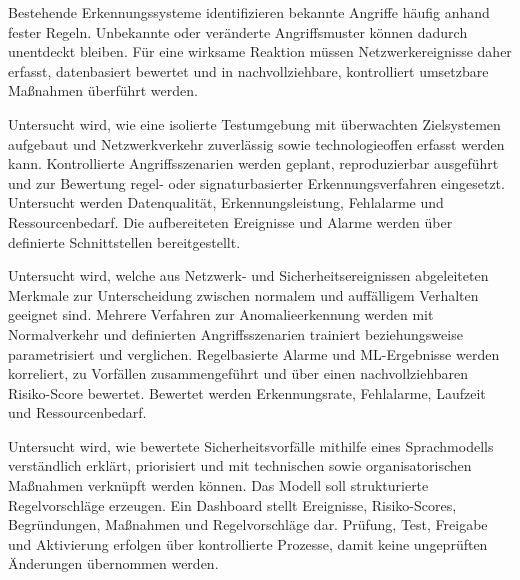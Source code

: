 \abschnittsautor{\alleautoren}


Bestehende Erkennungssysteme identifizieren bekannte Angriffe häufig anhand fester Regeln. Unbekannte oder veränderte Angriffsmuster können dadurch unentdeckt bleiben. Für eine wirksame Reaktion müssen Netzwerkereignisse daher erfasst, datenbasiert bewertet und in nachvollziehbare, kontrolliert umsetzbare Maßnahmen überführt werden.


Untersucht wird, wie eine isolierte Testumgebung mit überwachten Zielsystemen aufgebaut und Netzwerkverkehr zuverlässig sowie technologieoffen erfasst werden kann. Kontrollierte Angriffsszenarien werden geplant, reproduzierbar ausgeführt und zur Bewertung regel- oder signaturbasierter Erkennungsverfahren eingesetzt. Untersucht werden Datenqualität, Erkennungsleistung, Fehlalarme und Ressourcenbedarf. Die aufbereiteten Ereignisse und Alarme werden über definierte Schnittstellen bereitgestellt.

Untersucht wird, welche aus Netzwerk- und Sicherheitsereignissen abgeleiteten Merkmale zur Unterscheidung zwischen normalem und auffälligem Verhalten geeignet sind. Mehrere Verfahren zur Anomalieerkennung werden mit Normalverkehr und definierten Angriffsszenarien trainiert beziehungsweise parametrisiert und verglichen. Regelbasierte Alarme und ML-Ergebnisse werden korreliert, zu Vorfällen zusammengeführt und über einen nachvollziehbaren Risiko-Score bewertet. Bewertet werden Erkennungsrate, Fehlalarme, Laufzeit und Ressourcenbedarf.

Untersucht wird, wie bewertete Sicherheitsvorfälle mithilfe eines Sprachmodells verständlich erklärt, priorisiert und mit technischen sowie organisatorischen Maßnahmen verknüpft werden können. Das Modell soll strukturierte Regelvorschläge erzeugen. Ein Dashboard stellt Ereignisse, Risiko-Scores, Begründungen, Maßnahmen und Regelvorschläge dar. Prüfung, Test, Freigabe und Aktivierung erfolgen über kontrollierte Prozesse, damit keine ungeprüften Änderungen übernommen werden.

